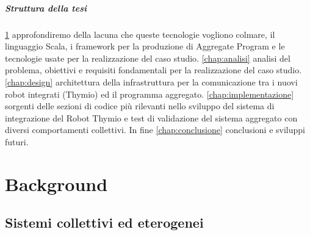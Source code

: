 \documentclass[12pt,a4paper,openright,twoside]{book}
\begin{document}

\paragraph{Struttura della tesi} \cref{chap:background} approfondiremo della lacuna che queste tecnologie vogliono colmare, il linguaggio Scala, i framework per la produzione di Aggregate Program e le tecnologie usate per la realizzazione del caso studio. \cref{chap:analisi} analisi del problema, obiettivi e requisiti fondamentali per la realizzazione del caso studio. \cref{chap:design} architettura della infrastruttura per la comunicazione tra i nuovi robot integrati (Thymio) ed il programma aggregato. \cref{chap:implementazione} sorgenti delle sezioni di codice più rilevanti nello sviluppo del sistema di integrazione del Robot Thymio e test di validazione del sistema aggregato con diversi comportamenti collettivi. In fine \cref{chap:conclusione} conclusioni e sviluppi futuri.

\chapter{Background}
\label{chap:background}



\section{Sistemi collettivi ed eterogenei} 

\end{document}
